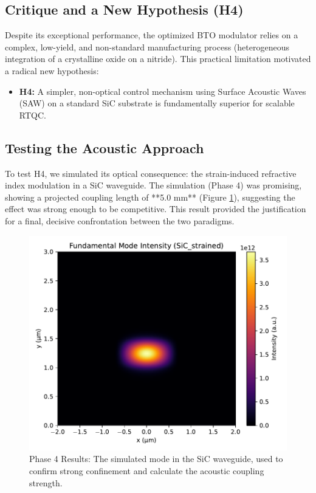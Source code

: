 \documentclass{article}
\begin{document}
\subsection{Critique and a New Hypothesis (H4)}
Despite its exceptional performance, the optimized BTO modulator relies on a complex, low-yield, and non-standard manufacturing process (heterogeneous integration of a crystalline oxide on a nitride). This practical limitation motivated a radical new hypothesis:
\begin{itemize}
    \item \textbf{H4:} A simpler, non-optical control mechanism using Surface Acoustic Waves (SAW) on a standard SiC substrate is fundamentally superior for scalable RTQC.
\end{itemize}

\subsection{Testing the Acoustic Approach}
To test H4, we simulated its optical consequence: the strain-induced refractive index modulation in a SiC waveguide. The simulation (Phase 4) was promising, showing a projected coupling length of **5.0 mm** (Figure \ref{fig:sicmode}), suggesting the effect was strong enough to be competitive. This result provided the justification for a final, decisive confrontation between the two paradigms.

\begin{figure}[H]
    \centering
    \includegraphics[width=0.7\linewidth]{simulation_v4_mode_SiC_strained.pdf}
    \caption{Phase 4 Results: The simulated mode in the SiC waveguide, used to confirm strong confinement and calculate the acoustic coupling strength.}
    \label{fig:sicmode}
\end{figure}
\end{document}
